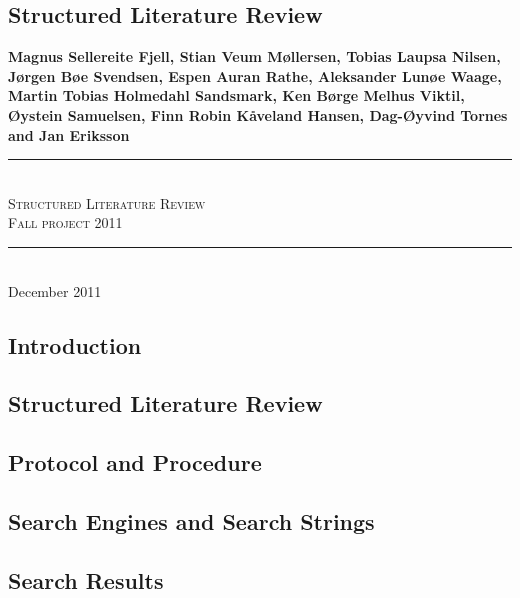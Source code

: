 \appendix
\begin{refsegment}

\chapter{Structured Literature Review}
\label{appendix:slrreport}

\newcommand{\slrTitle}{Structured Literature Review}
\newcommand{\slrSubtitle}{Fall project 2011}
\newcommand{\slrMadeby}{Magnus Sellereite Fjell, Stian Veum M{\o}llersen, Tobias Laupsa Nilsen, J{\o}rgen B{\o}e Svendsen, Espen Auran Rathe, Aleksander Lun{\o}e Waage, Martin Tobias Holmedahl Sandsmark, Ken B{\o}rge Melhus Viktil, {\O}ystein Samuelsen, Finn Robin K{\aa}veland Hansen, Dag-{\O}yvind Tornes and Jan Eriksson}
\newcommand{\slrDate}{December 2011}
\newcommand{\Hline}{\rule{\linewidth}{0.3mm} \\}

\begin{center}
\large \textbf{\slrMadeby}

\vspace{3cm}
\Hline
\Huge \textsc{\slrTitle}
\vspace{2cm}
\huge \\ \textsc{\slrSubtitle}
\Hline
\vfill
\normalsize \slrDate
\end{center}

\section{Introduction}


\section{Structured Literature Review}


\section{Protocol and Procedure}


\section{Search Engines and Search Strings}


\section{Search Results}


\clearpage

\end{refsegment}

\cleardoublepage
{}
{}
\printbibliography[segment=1, title=Structured Literature Review - Bibliography]

